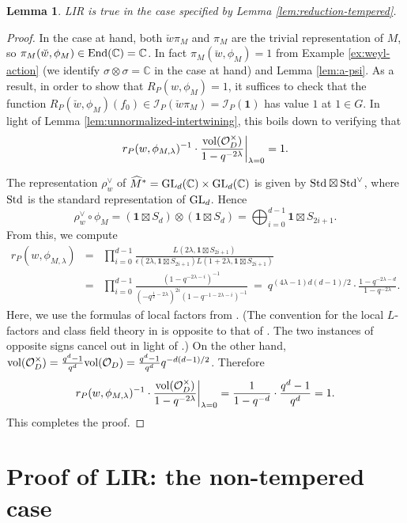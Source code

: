 \documentclass[11pt,reqno]{amsart}
\theoremstyle{plain}
\newtheorem{lem}[thm]{Lemma}
\theoremstyle{definition}
\newcommand{\C}{\mathbb{C}}
\newcommand{\cO}{\mathcal{O}}
\newcommand{\cI}{\mathcal{I}}
\newcommand{\Std}{\tu{Std}}
\newcommand{\End}{\tu{End}}
\newcommand{\GL}{\tu{GL}}
\newcommand{\triv}{{\mathbf{1}}}
\newcommand{\vol}{\tu{vol}}
\newcommand{\tu}{\textup}
\renewcommand{\hat}{\widehat}
\numberwithin{equation}{subsection}
\begin{document}
\begin{lem}\label{lem:LIR-tempered-special-case}
LIR is true in the case specified by Lemma \ref{lem:reduction-tempered}.
\end{lem}

\begin{proof}
In the case at hand, both $\breve{w}\pi_M$ and $\pi_M$ are the trivial representation of $M$, so $\pi_M(\breve{w}, \phi_M)\in \End(\C)=\C$. In fact $\pi_M(\breve{w}, \phi_M)=1$ from Example \ref{ex:weyl-action} (we identify $\sigma\otimes \sigma=\C$ in the case at hand) and Lemma \ref{lem:a-psi}. As a result, in order to show that $R_P(w,\phi_M)=1$, it suffices to check that the function $R_P(\breve{w},\phi_M)(f_0)\in \cI_P(\breve{w}\pi_M)=\cI_P(\triv)$ has value $1$ at $1\in G$.
In light of Lemma \ref{lem:unnormalized-intertwining}, this boils down to verifying that
\[
r_P(w,\phi_{M,\lambda})^{-1}\cdot\frac{\vol(\cO_D^\times)}{1-q^{-2\lambda}} \bigg\rvert_{\lambda=0} =1.
\]

The representation $\rho^\vee_w$ of $\hat M^*=\GL_d(\C)\times \GL_d(\C)$ is given by $\Std\boxtimes \Std^\vee$,
where $\Std$ is the standard representation of $\GL_d$. Hence
\[
\rho^\vee_w\circ \phi_M = (\triv\boxtimes S_d) \otimes(\triv\boxtimes S_d)= \bigoplus_{i=0}^{d-1}\triv\boxtimes S_{2i+1}.
\]
From this, we compute
\begin{eqnarray*}
 r_P(w,\phi_{M,\lambda}) &=& \prod_{i=0}^{d-1} \frac{L(2\lambda,\triv\boxtimes S_{2i+1})}{\epsilon(2\lambda,\triv\boxtimes S_{2i+1})L(1+2\lambda,\triv\boxtimes S_{2i+1})}   \\
 &=& \prod_{i=0}^{d-1}  \frac{(1-q^{-2\lambda-i})^{-1}}{(-q^{\frac{1}{2}-2\lambda})^{2i}(1-q^{-1-2\lambda-i})^{-1}} ~=~ q^{(4\lambda-1)d(d-1)/2}\cdot \frac{1-q^{-2\lambda-d}}{1-q^{-2\lambda}}.
\end{eqnarray*}
Here, we use the formulas of local factors from \cite[Appendix A.1]{AGIKMS}. (The convention for the local $L$-factors and class field theory in \cite{AGIKMS} is opposite to that of \cite{KMSW}. The two instances of opposite signs cancel out in light of \cite[App.~F.1]{AGIKMS}.)
On the other hand, $\vol(\cO_D^\times)=\tfrac{q^d-1}{q^d}\vol(\cO_D)=\tfrac{q^d-1}{q^d} q^{-d(d-1)/2}$.
Therefore
  \[
r_P(w,\phi_{M,\lambda})^{-1}\cdot\frac{\vol(\cO_D^\times)}{1-q^{-2\lambda}} \bigg\rvert_{\lambda=0}
= \frac{1}{1-q^{-d}}\cdot \frac{q^d-1}{q^d}=1.
  \]  
This completes the proof.
\end{proof}


\section{Proof of LIR: the non-tempered case}\label{s:proof-non-tempered}
\end{document}
